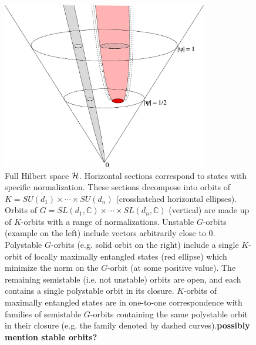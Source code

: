 \documentclass[12pt]{article}
\theoremstyle{definition}
\begin{document}
\begin{figure}
\centering
\includegraphics[width=0.8\textwidth]{cone.eps}
\caption{Full Hilbert space ${\cal H}$. Horizontal sections correspond to states with specific normalization. These sections decompose into orbits of $K = SU(d_1) \times \cdots \times SU(d_n)$ (crosshatched horizontal ellipses). Orbits of $G = SL(d_1, \mathbb{C}) \times \cdots \times SL(d_n,\mathbb{C})$ (vertical) are made up of $K$-orbits with a range of normalizations. Unstable $G$-orbits (example on the left) include vectors arbitrarily close to 0. Polystable $G$-orbits (e.g. solid orbit on the right) include a single $K$-orbit of locally maximally entangled states (red ellipse) which minimize the norm on the $G$-orbit (at some positive value). The remaining semistable (i.e. not unstable) orbits are open, and each contains a single polystable orbit in its closure. $K$-orbits of maximally entangled states are in one-to-one correspondence with families of semistable $G$-orbits containing the same polystable orbit in their closure (e.g. the family denoted by dashed curves).{\bf possibly mention stable orbits?}}
\label{fig:cone}
\end{figure}
\end{document}
